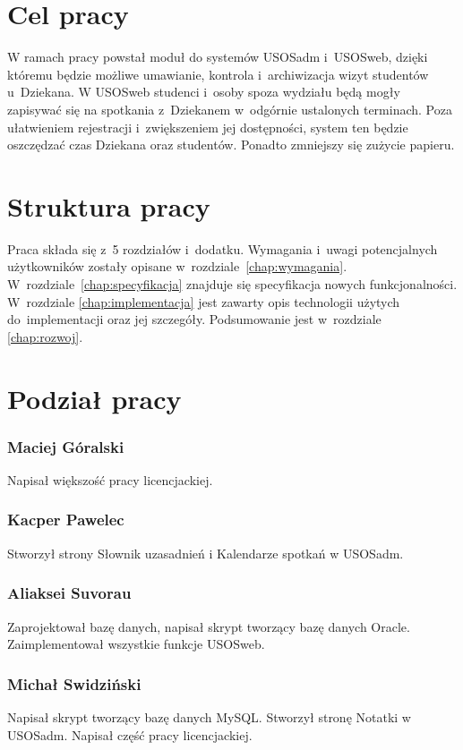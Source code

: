 \documentclass[licencjacka]{pracamgr}
\begin{document}
\section{Cel pracy}
W ramach pracy powstał moduł do systemów USOSadm i~USOSweb, dzięki któremu będzie możliwe umawianie, kontrola i~archiwizacja wizyt studentów u~Dziekana. W USOSweb studenci i~osoby spoza wydziału będą mogły zapisywać się na spotkania z~Dziekanem w~odgórnie ustalonych terminach. Poza ułatwieniem rejestracji i~zwiększeniem jej dostępności, system ten będzie oszczędzać czas Dziekana oraz studentów. Ponadto zmniejszy się zużycie papieru.
\section{Struktura pracy}
Praca składa się z~5 rozdziałów i~dodatku.
Wymagania i~uwagi potencjalnych użytkowników zostały opisane w~rozdziale~\ref{chap:wymagania}.
W~rozdziale~\ref{chap:specyfikacja} znajduje się specyfikacja nowych funkcjonalności. W~rozdziale \ref{chap:implementacja} jest zawarty opis technologii użytych do~implementacji oraz jej szczegóły. Podsumowanie jest w~rozdziale \ref{chap:rozwoj}.

\section{Podział pracy}
\subsubsection{Maciej Góralski}

Napisał większość pracy licencjackiej.
\subsubsection{Kacper Pawelec}

Stworzył strony Słownik uzasadnień i Kalendarze spotkań w USOSadm.
\subsubsection{Aliaksei Suvorau}

Zaprojektował bazę danych, napisał skrypt tworzący bazę danych Oracle. Zaimplementował wszystkie funkcje USOSweb.
\subsubsection{Michał Swidziński}

Napisał skrypt tworzący bazę danych MySQL. Stworzył stronę Notatki w USOSadm. Napisał część pracy licencjackiej.
\end{document}
